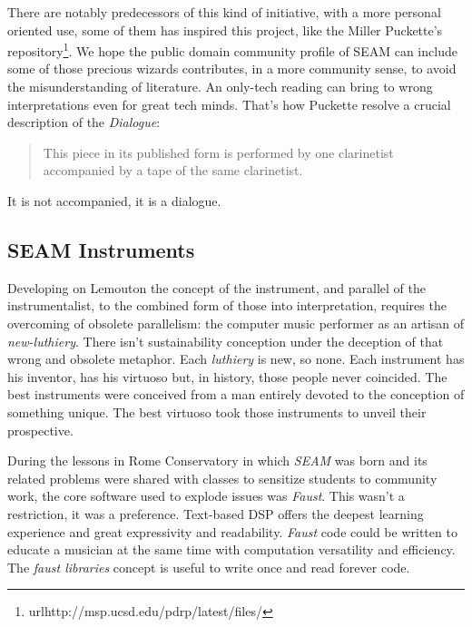 \documentclass[twoside,a4paper]{article}
\begin{document}
There are notably predecessors of this kind of initiative, with a more personal oriented use, some of them has inspired this project, like the Miller Puckette's repository\footnote{url{http://msp.ucsd.edu/pdrp/latest/files/}}. We hope the public domain community profile of SEAM can include some of those precious wizards contributes, in a more community sense, to avoid the misunderstanding of literature. An only-tech reading can bring to wrong interpretations even for great tech minds. That's how Puckette\cite{mp01} resolve a crucial description of the \emph{Dialogue}:

\begin{quote}
This piece in its published form is performed by one clarinetist accompanied by a tape of the same clarinetist.
\end{quote}

It is not accompanied, it is a dialogue. 


\subsection{SEAM Instruments}

Developing on Lemouton\cite{lem16} the concept of the instrument, and parallel of the instrumentalist, to the combined form of those into interpretation, requires the overcoming of obsolete parallelism: the computer music performer as an artisan of \emph{new-luthiery}. There isn't sustainability conception under the deception of that wrong and obsolete metaphor. Each \emph{luthiery} is new, so none. Each instrument has his inventor,  has his virtuoso but, in history, those people never coincided. The best instruments were conceived from a man entirely devoted to the conception of something unique. The best virtuoso took those instruments to unveil their prospective.


During the lessons in Rome Conservatory in which \emph{SEAM} was born and its related problems were shared with classes to sensitize students to community work, the core software used to explode issues was \emph{Faust}. This wasn't a restriction, it was a preference. Text-based DSP offers the deepest learning experience and great expressivity and readability. \emph{Faust} code could be written to educate a musician at the same time with computation versatility and efficiency. The \emph{faust libraries} concept is useful to write once and read forever code.
\end{document}

